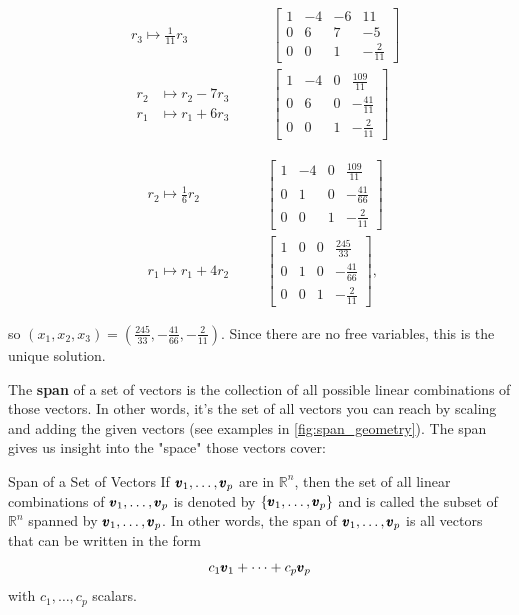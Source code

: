 \begin{example}
\[
\begin{alignedat}{3}
& r_3 \mapsto \frac{1}{11} r_3 \quad &
& \left[\begin{array}{cccc}
1 & -4 & -6 & 11 \\
0 & 6 & 7 & -5 \\
0 & 0 & 1 & -\frac{2}{11}
\end{array}\right] \\[10pt]
& \begin{aligned}
    r_2 & \mapsto r_2 - 7r_3 \\
    r_1 & \mapsto r_1 + 6r_3
\end{aligned} & \quad &
\left[\begin{array}{cccc}
1 & -4 & 0 & \frac{109}{11} \\
0 & 6 & 0 & -\frac{41}{11} \\
0 & 0 & 1 & -\frac{2}{11}
\end{array}\right]
\end{alignedat}
\]

\[
\begin{alignedat}{3}
& r_2 \mapsto \frac{1}{6}r_2 \quad &
& \left[\begin{array}{cccc}
1 & -4 & 0 & \frac{109}{11} \\
0 & 1 & 0 & -\frac{41}{66} \\
0 & 0 & 1 & -\frac{2}{11}
\end{array}\right] \\[10pt]
& r_1 \mapsto r_1 + 4r_2 \quad &
& \left[\begin{array}{cccc}
1 & 0 & 0 & \frac{245}{33} \\
0 & 1 & 0 & -\frac{41}{66} \\
0 & 0 & 1 & -\frac{2}{11}
\end{array}\right],
\end{alignedat}
\]

so $\left(x_1, x_2, x_3\right)=\left(\frac{245}{33},-\frac{41}{66},-\frac{2}{11}\right)$. Since there are no free variables, this is the unique solution.

\end{example}

The \textbf{span} of a set of vectors is the collection of all possible linear combinations of those vectors. In other words, it's the set of all vectors you can reach by scaling and adding the given vectors (see examples in \autoref{fig:span_geometry}). The span gives us insight into the "space" those vectors cover:

\begin{definition}{Span of a Set of Vectors}
    If $\pmb{v}_1, \ldots, \pmb{v}_p$ are in $\mathbb{R}^n$, then the set of all linear combinations of $\pmb{v}_1, \ldots, \pmb{v}_p$ is denoted by  $\left\{\pmb{v}_1, \ldots, \pmb{v}_p\right\}$ and is called the subset of $\mathbb{R}^n$ spanned by $\pmb{v}_1, \ldots, \pmb{v}_p$. In other words, the span of $\pmb{v}_1, \ldots, \pmb{v}_p$ is all vectors that can be written in the form
    $$
    c_1 \pmb{v}_1 + \cdots + c_p \pmb{v}_p
    $$
    with $c_1, \ldots, c_p$ scalars.

\end{definition}

